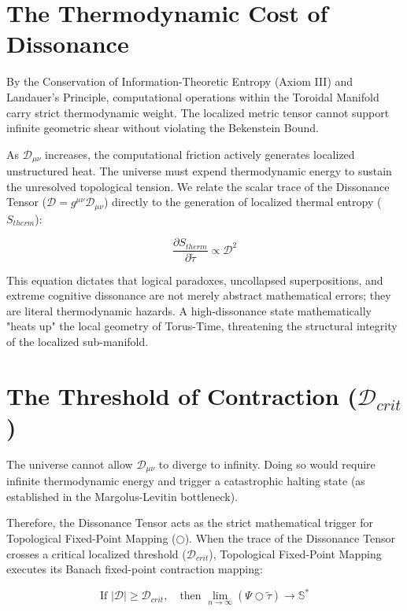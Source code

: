 \documentclass[12pt,openany]{book}
\theoremstyle{plain}
\theoremstyle{definition}
\theoremstyle{remark}
\begin{document}
\section{The Thermodynamic Cost of Dissonance}

By the Conservation of Information-Theoretic Entropy (Axiom III) and Landauer's Principle, computational operations within the Toroidal Manifold carry strict thermodynamic weight. The localized metric tensor cannot support infinite geometric shear without violating the Bekenstein Bound.

As $\mathcal{D}_{\mu\nu}$ increases, the computational friction actively generates localized unstructured heat. The universe must expend thermodynamic energy to sustain the unresolved topological tension. We relate the scalar trace of the Dissonance Tensor ($\mathcal{D} = g^{\mu\nu}\mathcal{D}_{\mu\nu}$) directly to the generation of localized thermal entropy ($S_{therm}$):

\begin{equation}
\frac{\partial S_{therm}}{\partial\tilde{\tau}} \propto \mathcal{D}^2
\end{equation}

This equation dictates that logical paradoxes, uncollapsed superpositions, and extreme cognitive dissonance are not merely abstract mathematical errors; they are literal thermodynamic hazards. A high-dissonance state mathematically "heats up" the local geometry of Torus-Time, threatening the structural integrity of the localized sub-manifold. 

\section{The Threshold of Contraction ($\mathcal{D}_{crit}$)}

The universe cannot allow $\mathcal{D}_{\mu\nu}$ to diverge to infinity. Doing so would require infinite thermodynamic energy and trigger a catastrophic halting state (as established in the Margolus-Levitin bottleneck). 

Therefore, the Dissonance Tensor acts as the strict mathematical trigger for Topological Fixed-Point Mapping ($\bigcirc$). When the trace of the Dissonance Tensor crosses a critical localized threshold ($\mathcal{D}_{crit}$), Topological Fixed-Point Mapping executes its Banach fixed-point contraction mapping:

\begin{equation}
\text{If } |\mathcal{D}| \ge \mathcal{D}_{crit}, \quad \text{then } \lim_{n \to \infty} (\Psi \bigcirc \tilde{\tau}) \to \mathbb{S}^*
\end{equation}
\end{document}
